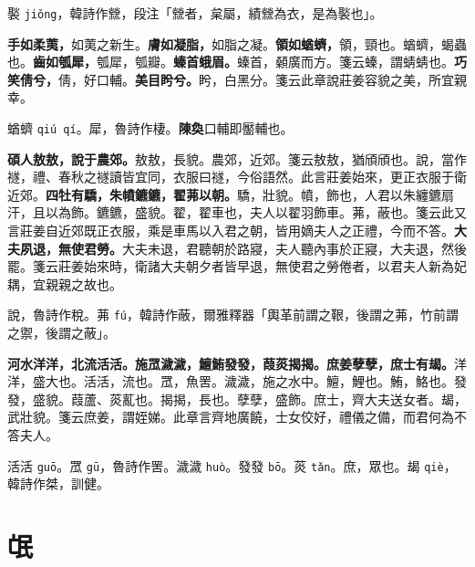 \begin{quoting}褧 \texttt{jiǒng}，韓詩作檾，段注「檾者，枲屬，績檾為衣，是為褧也」。\end{quoting}

\textbf{手如柔荑，}{\footnotesize 如荑之新生。}\textbf{膚如凝脂，}{\footnotesize 如脂之凝。}\textbf{領如蝤蠐，}{\footnotesize 領，頸也。蝤蠐，蝎蟲也。}\textbf{齒如瓠犀，}{\footnotesize 瓠犀，瓠瓣。}\textbf{螓首蛾眉。}{\footnotesize 螓首，顙廣而方。箋云螓，謂蜻蜻也。}\textbf{巧笑倩兮，}{\footnotesize 倩，好口輔。}\textbf{美目盻兮。}{\footnotesize 盻，白黑分。箋云此章說莊姜容貌之美，所宜親幸。}

\begin{quoting}蝤蠐 \texttt{qiú qí}。犀，魯詩作棲。\textbf{陳奐}口輔即靨輔也。\end{quoting}

\textbf{碩人敖敖，說于農郊。}{\footnotesize 敖敖，長貌。農郊，近郊。箋云敖敖，猶頎頎也。說，當作禭，禮、春秋之禭讀皆宜同，衣服曰禭，今俗語然。此言莊姜始來，更正衣服于衛近郊。}\textbf{四牡有驕，朱幩鑣鑣，翟茀以朝。}{\footnotesize 驕，壯貌。幩，飾也，人君以朱纏鑣扇汗，且以為飾。鑣鑣，盛貌。翟，翟車也，夫人以翟羽飾車。茀，蔽也。箋云此又言莊姜自近郊既正衣服，乘是車馬以入君之朝，皆用嫡夫人之正禮，今而不答。}\textbf{大夫夙退，無使君勞。}{\footnotesize 大夫未退，君聽朝於路寢，夫人聽內事於正寢，大夫退，然後罷。箋云莊姜始來時，衛諸大夫朝夕者皆早退，無使君之勞倦者，以君夫人新為妃耦，宜親親之故也。}

\begin{quoting}說，魯詩作稅。茀 \texttt{fú}，韓詩作蔽，爾雅釋器「輿革前謂之鞎，後謂之茀，竹前謂之禦，後謂之蔽」。\end{quoting}

\textbf{河水洋洋，北流活活。施罛濊濊，鱣鮪發發，葭菼揭揭。庶姜孽孽，庶士有朅。}{\footnotesize 洋洋，盛大也。活活，流也。罛，魚罟。濊濊，施之水中。鱣，鯉也。鮪，鮥也。發發，盛貌。葭蘆、菼薍也。揭揭，長也。孽孽，盛飾。庶士，齊大夫送女者。朅，武壯貌。箋云庶姜，謂姪娣。此章言齊地廣饒，士女佼好，禮儀之備，而君何為不答夫人。}

\begin{quoting}活活 \texttt{guō}。罛 \texttt{gū}，魯詩作罟。濊濊 \texttt{huò}。發發 \texttt{bō}。菼 \texttt{tǎn}。庶，眾也。朅 \texttt{qiè}，韓詩作桀，訓健。\end{quoting}

\section{氓}


